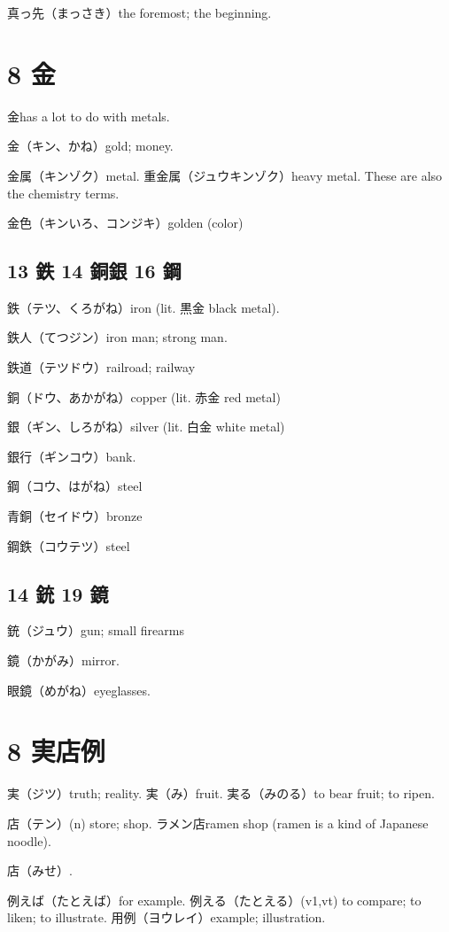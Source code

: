 真っ先（まっさき）the foremost; the beginning.

\section{8 金}

金has a lot to do with metals.

金（キン、かね）gold; money.

金属（キンゾク）metal.
重金属（ジュウキンゾク）heavy metal.
These are also the chemistry terms.

金色（キンいろ、コンジキ）golden (color)

\subsection{13 鉄 14 銅銀 16 鋼}

鉄（テツ、くろがね）iron (lit. 黒金 black metal).

鉄人（てつジン）iron man; strong man.

鉄道（テツドウ）railroad; railway

銅（ドウ、あかがね）copper (lit. 赤金 red metal)

銀（ギン、しろがね）silver (lit. 白金 white metal)

銀行（ギンコウ）bank.

鋼（コウ、はがね）steel

青銅（セイドウ）bronze

鋼鉄（コウテツ）steel

\subsection{14 銃 19 鏡}

銃（ジュウ）gun; small firearms

鏡（かがみ）mirror.

眼鏡（めがね）eyeglasses.

\section{8 実店例}

実（ジツ）truth; reality.
実（み）fruit.
実る（みのる）to bear fruit; to ripen.

店（テン）(n) store; shop.
ラメン店ramen shop (ramen is a kind of Japanese noodle).

店（みせ）.

例えば（たとえば）for example.
例える（たとえる）(v1,vt)
to compare; to liken; to illustrate.
用例（ヨウレイ）example; illustration.

